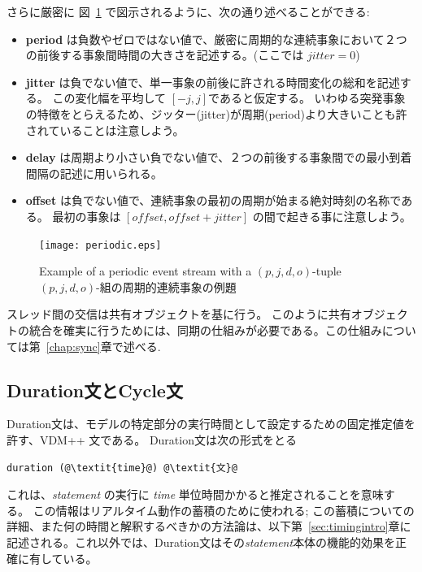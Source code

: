 \documentclass[\pformat,12pt]{jreport}
\begin{document}
さらに厳密に 図~\ref{fig:perioddef} で図示されるように、次の通り述べることができる:
\begin{itemize}
\item \textbf{period} は負数やゼロではない値で、厳密に周期的な連続事象において２つの前後する事象間時間の大きさを記述する。(ここでは $jitter=0$)
\item \textbf{jitter} は負でない値で、単一事象の前後に許される時間変化の総和を記述する。
この変化幅を平均して $[-j,j]$であると仮定する。
いわゆる突発事象の特徴をとらえるため、ジッター(jitter)が周期(period)より大きいことも許されていることは注意しよう。
\item \textbf{delay} は周期より小さい負でない値で、２つの前後する事象間での最小到着間隔の記述に用いられる。
\item \textbf{offset} は負でない値で、連続事象の最初の周期が始まる絶対時刻の名称である。
最初の事象は $[offset,offset + jitter]$ の間で起きる事に注意しよう。
\end{itemize}

\begin{figure}[!htb]
\begin{center}
\texttt{[image: periodic.eps]}
\end{center}
\caption{Example of a periodic event stream with a $(p,j,d,o)$-tuple  $(p,j,d,o)$-組の周期的連続事象の例題\label{fig:perioddef}}
\end{figure}

スレッド間の交信は共有オブジェクトを基に行う。
このように共有オブジェクトの統合を確実に行うためには、同期の仕組みが必要である。この仕組みについては第~\ref{chap:sync}章で述べる.

\subsection{Duration文とCycle文}

Duration文は、モデルの特定部分の実行時間として設定するための固定推定値を許す、VDM++ 文である。
Duration文は次の形式をとる

\begin{lstlisting}
duration (@\textit{time}@) @\textit{文}@
\end{lstlisting}

これは、\emph{statement} の実行に \emph{time} 単位時間かかると推定されることを意味する。
この情報はリアルタイム動作の蓄積のために使われる; この蓄積についての詳細、また何の時間と解釈するべきかの方法論は、以下第~\ref{sec:timingintro}章に記述される。これ以外では、Duration文はその\textit{statement}本体の機能的効果を正確に有している。
\end{document}

